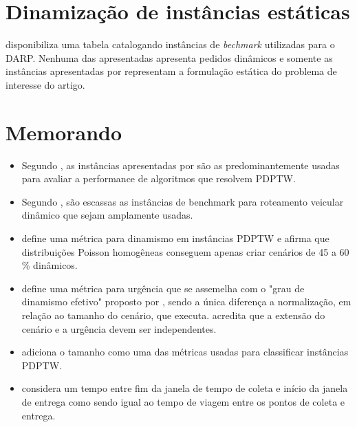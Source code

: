 \documentclass{anpet}
\begin{document}
\section{Dinamização de instâncias estáticas}
\textcite{ho_survey_2018} disponibiliza uma tabela catalogando instâncias de \textit{bechmark} utilizadas para o DARP. Nenhuma das apresentadas apresenta pedidos dinâmicos e somente as instâncias apresentadas por \textcite{cordeau_branch-and-cut_2006, cordeau_tabu_2003, ropke_models_2007} representam a formulação estática do problema de interesse do artigo.

 
\section{Memorando}
\begin{itemize}
    \item Segundo \textcite{parragh_survey_2008-1}, as instâncias apresentadas por \textcite{li_metaheuristic_2003} são as predominantemente usadas para avaliar a performance de algoritmos que resolvem PDPTW.

    \item Segundo \textcite{pillac_review_2013}, são escassas as instâncias de benchmark para roteamento veicular dinâmico que sejam amplamente usadas.

    \item \textcite{van_lon_measures_2016} define uma métrica para dinamismo em instâncias PDPTW e afirma que distribuições Poisson homogêneas conseguem apenas criar cenários de 45 a 60 \% dinâmicos. 

   \item \textcite{van_lon_measures_2016} define uma métrica para urgência que se assemelha com o "grau de dinamismo efetivo" proposto por \textcite{larsen_partially_2002}, sendo a única diferença a normalização, em relação ao tamanho do cenário, que \textcite{larsen_partially_2002} executa. \textcite{van_lon_measures_2016} acredita que a extensão do cenário e a urgência devem ser independentes.

   \item \textcite{van_lon_towards_2015} adiciona o tamanho como uma das métricas usadas para classificar instâncias PDPTW.   
   
   \item \textcite{berbeglia_hybrid_2012} considera um tempo entre fim da janela de tempo de coleta e início da janela de entrega como sendo igual ao tempo de viagem entre os pontos de coleta e entrega.
   

\end{itemize}
\end{document}
